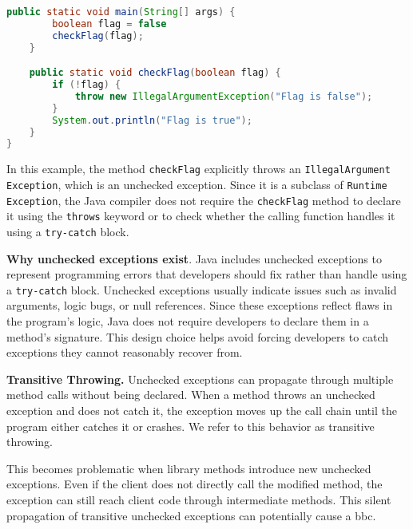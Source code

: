 \begin{itemize}
\begin{lstlisting}[language=java]
    public static void main(String[] args) {
        boolean flag = false
        checkFlag(flag);
    }

    public static void checkFlag(boolean flag) {
        if (!flag) {
            throw new IllegalArgumentException("Flag is false");
        }
        System.out.println("Flag is true");
    }
}
    \end{lstlisting}
    In this example, the method \texttt{checkFlag} explicitly throws an \texttt{IllegalArgument\\Exception},
    which is an unchecked exception. Since it is a subclass of \texttt{Runtime\\Exception}, the Java compiler
    does not require the \texttt{checkFlag} method to declare it using the \texttt{throws} keyword or
    to check whether the calling function handles it using a \texttt{try-catch} block.
\end{itemize}

\textbf{Why unchecked exceptions exist}. Java includes unchecked exceptions to represent programming errors that developers should fix rather than handle using a \texttt{try-catch} block. Unchecked exceptions usually indicate issues such as invalid arguments, logic bugs, or null references. Since these exceptions reflect flaws in the program's logic, Java does not require developers to declare them in a method’s signature. This design choice helps avoid forcing developers to catch exceptions they cannot reasonably recover from.

\textbf{Transitive Throwing.} Unchecked exceptions can propagate through multiple method calls without being declared. When a method throws an unchecked exception and does not catch it, the exception moves up the call chain until the program either catches it or crashes. We refer to this behavior as transitive throwing.

This becomes problematic when library methods introduce new unchecked exceptions. Even if the client does not directly call the modified method, the exception can still reach client code through intermediate methods. This silent propagation of transitive unchecked exceptions can potentially cause a \gls{bbc}.

